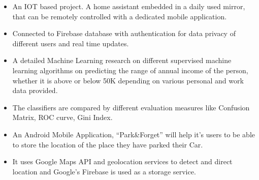 \documentclass[10pt,a4paper]{altacv}
\begin{document}
\begin{itemize}
\item  An IOT based project. A home assistant embedded in a daily used mirror, that can be remotely controlled with a dedicated mobile application.
\item Connected to Firebase database with authentication for data privacy of different users and real time updates.
\end{itemize}

\divider

\begin{itemize}
\item A detailed Machine Learning research on different supervised machine learning algorithms on predicting the range of annual income of the person, whether it is above or below 50K depending on various personal and work data provided.
\item The classifiers are compared by different evaluation measures like Confusion Matrix, ROC curve, Gini Index.
\end{itemize}
\medskip

\divider


\begin{itemize}
\item  An Android Mobile Application, “Park\&Forget” will help it’s users to be able to store the location of the place they have parked their Car.
\item It uses Google Maps API and geolocation services to detect and direct location and Google's Firebase is used as a storage service.
\end{itemize}
\medskip





\end{document}
